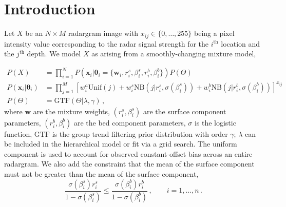 \section{Introduction}
\label{sec:introduction}
Let $X$ be an $N \times M$ radargram image with $x_{ij} \in \{0, \ldots, 255\}$ being a pixel intensity value corresponding to the radar signal strength for the $i^\text{th}$ location and the $j^\text{th}$ depth. We model $X$ as arising from a smoothly-changing mixture model,

\begin{align}
P(X) &= \prod_{i=1}^N P(\mathbf{x}_i | \boldsymbol\theta_i = \{ \mathbf{w}_i, r_i^s, \beta_i^s, r_i^b, \beta_i^b \}) P(\Theta) \\ 
P(\mathbf{x}_i | \boldsymbol\theta_i) &= \prod_{j=1}^M \left[ w_{i}^a\text{Unif}(j) + w_{i}^s\text{NB}(j | r_i^s, \sigma(\beta_i^s)) + w_{i}^b\text{NB}(j | r_i^b, \sigma(\beta_i^b)) \right]^{x_{ij}} \\
P(\Theta) &= \text{GTF}(\Theta | \lambda, \gamma) \, ,
\end{align}
where $\mathbf{w}$ are the mixture weights, $(r_i^s, \beta_i^s)$ are the surface component parameters, $(r_i^b, \beta_i^b)$ are the bed component parameters, $\sigma$ is the logistic function, $\text{GTF}$ is the group trend filtering prior distribution with order $\gamma$; $\lambda$ can be included in the hierarchical model or fit via a grid search. The uniform component is used to account for observed constant-offset bias across an entire radargram. We also add the constraint that the mean of the surface component must not be greater than the mean of the surface component,
\begin{equation}
\label{eqn:surface_bed_constraint}
\frac{\sigma(\beta_i^s) r_i^s}{1 - \sigma(\beta_i^s)} \leq \frac{\sigma(\beta_i^b) r_i^b}{1 - \sigma(\beta_i^b)} \,, \qquad i = 1, \ldots, n \, .
\end{equation}